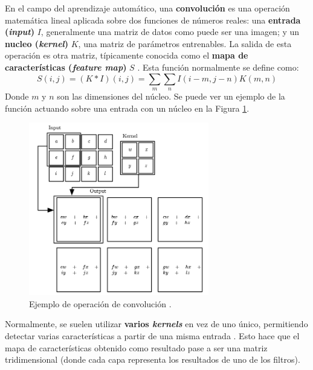 En el campo del aprendizaje automático, una \textbf{convolución} es una operación matemática lineal aplicada sobre dos funciones de números reales: una \textbf{entrada (\textit{input})} $I$, generalmente una matriz de datos como puede ser una imagen; y un \textbf{nucleo (\textit{kernel})} $K$, una matriz de parámetros entrenables. La salida de esta operación es otra matriz, típicamente conocida como el \textbf{mapa de características (\textit{feature map})} $S$ \cite{Goodfellow-et-al-2016}. Esta función normalmente se define como:
\[S(i,j)=(K*I)(i,j)=\sum_m \sum_n I(i-m,j-n)K(m,n)\]
Donde $m$ y $n$ son las dimensiones del núcleo. Se puede ver un ejemplo de la función actuando sobre una entrada con un núcleo en la Figura \ref{fig:chap3-conv}.
\begin{figure}[h]
    \centering
    \includegraphics[width=0.7\textwidth]{imagenes/cap3/conv.png}
    \caption{Ejemplo de operación de convolución \cite{Goodfellow-et-al-2016}.}
    \label{fig:chap3-conv}
\end{figure}

Normalmente, se suelen utilizar \textbf{varios \textit{kernels}} en vez de uno único, permitiendo detectar varias características a partir de una misma entrada \cite{10.5555/3161223}. Esto hace que el mapa de características obtenido como resultado pase a ser una matriz tridimensional (donde cada capa representa los resultados de uno de los filtros).

